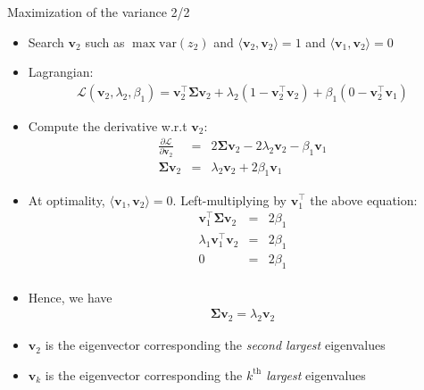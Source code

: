\documentclass[10pt,aspectratio=1610]{beamer}
\begin{document}
\begin{frame}[label={sec:orgd6c5f02}]{Maximization of the variance 2/2}
\begin{itemize}
\item <1-> Search \(\mathbf{v}_2\) such as \(\max\text{var}(z_2)\) and \(\langle\mathbf{v}_2,\mathbf{v}_2\rangle=1\) and \(\langle\mathbf{v}_1,\mathbf{v}_2\rangle=0\)
\item <2-> Lagrangian:
\begin{eqnarray*}
  \mathcal{L}(\mathbf{v}_2,\lambda_2,\beta_1) = \mathbf{v}_2^\top\boldsymbol{\Sigma}\mathbf{v}_2 + \lambda_2(1- \mathbf{v}_2^\top\mathbf{v}_2) + \beta_1(0 - \mathbf{v}_2^\top\mathbf{v}_1)
\end{eqnarray*}
\item <3-> Compute the derivative w.r.t \(\mathbf{v}_2\):
\begin{eqnarray*}
\frac{\partial\mathcal{L}}{\partial\mathbf{v}_2} &=& 2\boldsymbol{\Sigma}\mathbf{v}_2-2\lambda_2\mathbf{v}_2-\beta_1\mathbf{v}_1\\
\boldsymbol{\Sigma}\mathbf{v}_2 &=& \lambda_2\mathbf{v}_2+2\beta_1\mathbf{v}_1
\end{eqnarray*}
\item <4-> At optimality, \(\langle\mathbf{v}_1,\mathbf{v}_2\rangle=0\). Left-multiplying by \(\mathbf{v}_1^\top\) the above equation:
\begin{eqnarray*}
  \mathbf{v}_1^\top\boldsymbol{\Sigma}\mathbf{v}_2 &=& 2\beta_1 \\
  \lambda_1\mathbf{v}_1^\top\mathbf{v}_2 &=& 2\beta_1 \\
  0 &=& 2\beta_1 \\
\end{eqnarray*}
\item <5-> Hence, we have 
\begin{eqnarray*}
  \boldsymbol{\Sigma}\mathbf{v}_2 =\lambda_2\mathbf{v}_2
\end{eqnarray*}
\item <6-> \(\mathbf{v}_2\) is the eigenvector corresponding the \emph{second largest} eigenvalues
\item <7-> \(\mathbf{v}_k\) is the eigenvector corresponding the \emph{\(k^{\text{th}}\) largest} eigenvalues
\end{itemize}
\end{frame}
\end{document}
